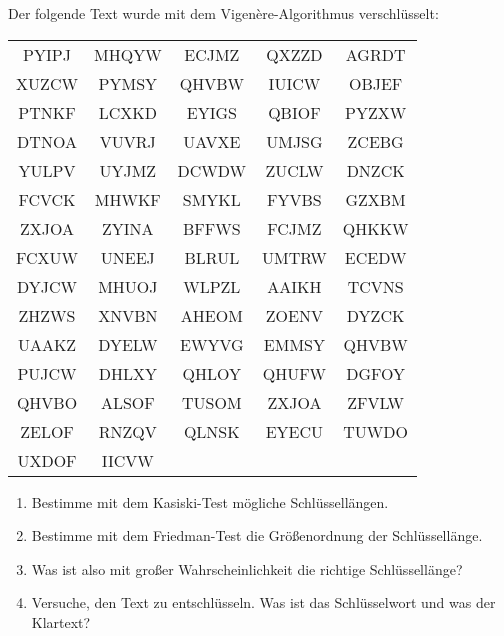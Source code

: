 \documentclass{zusammenfassung}
\begin{document}
\pagebreak
\begin{aufgabe}
  Der folgende Text wurde mit dem Vigenère-Algorithmus verschlüsselt:

  \begin{center}
    \begin{tabular}{ccccc}
      PYIPJ&MHQYW&ECJMZ&QXZZD&AGRDT\\
      XUZCW&PYMSY&QHVBW&IUICW&OBJEF\\
      PTNKF&LCXKD&EYIGS&QBIOF&PYZXW\\
      DTNOA&VUVRJ&UAVXE&UMJSG&ZCEBG\\
      YULPV&UYJMZ&DCWDW&ZUCLW&DNZCK\\[1ex]

      FCVCK&MHWKF&SMYKL&FYVBS&GZXBM\\
      ZXJOA&ZYINA&BFFWS&FCJMZ&QHKKW\\
      FCXUW&UNEEJ&BLRUL&UMTRW&ECEDW\\
      DYJCW&MHUOJ&WLPZL&AAIKH&TCVNS\\
      ZHZWS&XNVBN&AHEOM&ZOENV&DYZCK\\[1ex]

      UAAKZ&DYELW&EWYVG&EMMSY&QHVBW\\
      PUJCW&DHLXY&QHLOY&QHUFW&DGFOY\\
      QHVBO&ALSOF&TUSOM&ZXJOA&ZFVLW\\
      ZELOF&RNZQV&QLNSK&EYECU&TUWDO\\
      UXDOF&IICVW
    \end{tabular}
  \end{center}
  \begin{enumerate}
    \item Bestimme mit dem Kasiski-Test mögliche Schlüssellängen.
    \item Bestimme mit dem Friedman-Test die Größenordnung der Schlüssellänge.
    \item Was ist also mit großer Wahrscheinlichkeit die richtige Schlüssellänge?
    \item Versuche, den Text zu entschlüsseln. Was ist das Schlüsselwort und was der Klartext?
  \end{enumerate}
\end{aufgabe}
\end{document}
